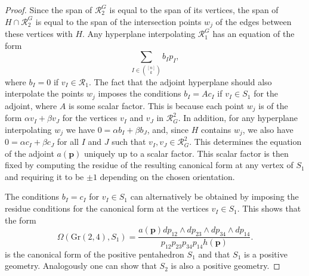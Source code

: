 \documentclass[12pt]{extarticle}
\theoremstyle{definition}
\newtheorem{remark}[theorem]{Remark}
\begin{document}
\begin{proof}
Since the span of $\mathcal{R}_2^G$ is equal to the span of its vertices, the span of $H \cap \mathcal{R}_2^G$ is equal to the span of the intersection points $w_j$ of the edges between these vertices with $H$.
Any hyperplane interpolating $\mathcal{R}_1^G$ has an equation of the form 
$$\sum\limits_{I \in \binom{[n]}{k}} b_I p_I,$$
where $b_I =0$ if $v_I \in \mathcal{R}_1$. The fact that the adjoint hyperplane should also interpolate the points $w_j$ imposes the conditions $b_I = Ac_I$ if $v_I\in S_1$ for the adjoint, where $A$ is some scalar factor. This is because each point $w_j$ is of the form $\alpha v_I + \beta v_J$ for the vertices $v_I$ and $v_J$ in $\mathcal{R}_G^2$. In addition, for any hyperplane interpolating $w_j$ we have $0=\alpha b_I+ \beta b_J$, and, since $H$ contains $w_j$, we also have $0=\alpha c_I+ \beta c_J$ for all $I$ and $J$ such that $v_I, v_J \in \mathcal{R}_G^2$. This determines the equation of the adjoint $a(\mathbf{p})$ uniquely up to a scalar factor. This scalar factor is then fixed by computing the residue of the resulting canonical form at any vertex of $S_1$ and requiring it to be $\pm 1$ depending on the chosen orientation.

The conditions $b_I=c_I$ for $v_I\in S_1$ can alternatively be obtained by imposing the residue conditions for the canonical form at the vertices $v_I \in S_1$. This shows that the form 
$$
\Omega(\mathrm{Gr}(2,4), S_1) = \dfrac{a(\mathbf{p}) dp_{12}\wedge dp_{23} \wedge dp_{34} \wedge dp_{14} }{p_{12}p_{23}p_{34}p_{14} h(\mathbf{p})}.
$$
is the canonical form of the positive pentahedron $S_1$ and that $S_1$ is a positive geometry. Analogously one can show that $S_2$ is also a positive geometry.

\end{proof}

\end{document}
